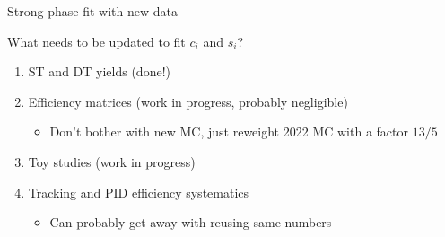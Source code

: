 \documentclass{beamer}
\begin{document}
\begin{frame}{Strong-phase fit with new data}
  \begin{center}
    \Large{What needs to be updated to fit $c_i$ and $s_i$?}
  \end{center}
  \vspace{0.1cm}
  \begin{enumerate}
    \setlength\itemsep{1.0em}
    \item{ST and DT yields (done!)}
    \item{Efficiency matrices (work in progress, probably negligible)}
    \begin{itemize}
      \item{Don't bother with new MC, just reweight 2022 MC with a factor $13/5$}
    \end{itemize}
    \item{Toy studies (work in progress)}
    \item{Tracking and PID efficiency systematics}
    \begin{itemize}
      \item{Can probably get away with reusing same numbers}
    \end{itemize}
  \end{enumerate}
\end{frame}
\end{document}
